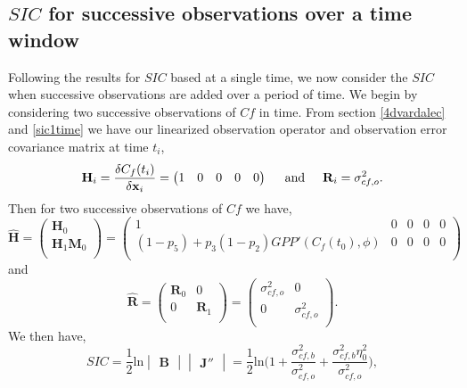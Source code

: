 \documentclass[11pt]{article}
\begin{document}
\subsection{$SIC$ for successive observations over a time window} \label{SICsucc}%

Following the results for $SIC$ based at a single time, we now consider the $SIC$ when successive observations are added over a period of time. We begin by considering two successive observations of $Cf$ in time. From section \ref{4dvardalec} and \ref{sic1time} we have our linearized observation operator and observation error covariance matrix at time $t_i$,
\begin{equation}
\mathbf{H}_{i} = \frac{\delta C_f(t_i)}{\delta\textbf{x}_i} = \begin{pmatrix}
1 & 0 & 0 & 0 & 0
\end{pmatrix}
\hspace{5mm} \text{and} \hspace{5mm}
\mathbf{R}_i=\sigma_{cf,o}^{2}.
\end{equation}
Then for two successive observations of $Cf$ we have,
\begin{equation}
\hat{\mathbf{H}}=
\begin{pmatrix}
\mathbf{H}_0 \\
\mathbf{H}_1\mathbf{M}_0\\
\end{pmatrix}
=
\begin{pmatrix}
1 & 0 & 0 & 0 & 0 \\
(1-p_5)+p_3(1-p_2)GPP'(C_f(t_0),\phi) & 0 & 0 & 0 & 0\\
\end{pmatrix}
\end{equation}
and
\begin{equation}
\hat{\mathbf{R}}=
\begin{pmatrix}
\mathbf{R}_0 & 0  \\
0 & \mathbf{R}_1  \\
\end{pmatrix}
=
\begin{pmatrix}
\sigma_{cf,o}^{2} & 0  \\
0 & \sigma_{cf,o}^{2}  \\
\end{pmatrix}.
\end{equation}
We then have,
\begin{equation}
SIC = \frac{1}{2}\text{ln}\begin{vmatrix} \mathbf{B} \end{vmatrix}\begin{vmatrix} \mathbf{J}'' \end{vmatrix} =\frac{1}{2}\text{ln} \bigg(1+\frac{\sigma_{cf,b}^{2}}{\sigma_{cf,o}^{2}}+\frac{\sigma_{cf,b}^{2}\eta_0^{2}}{\sigma_{cf,o}^{2}} \bigg),
\end{equation}
\end{document}
